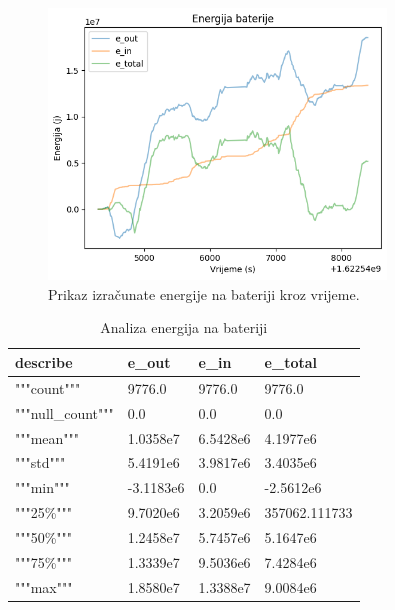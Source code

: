 \begin{figure}
    \centering
    \includegraphics[width=0.8\textwidth]{images/energies_battery.png}
    \caption{Prikaz izračunate energije na bateriji kroz vrijeme.}
    \label{fig:h:energy_graph}
\end{figure}


\begin{table}[!ht]
    \centering
    \caption{Analiza energija na bateriji}
    \begin{tabular}{llll}
    \hline
        \textbf{describe} & \textbf{e\_out} & \textbf{e\_in} & \textbf{e\_total} \\ \hline
        """count""" & 9776.0 & 9776.0 & 9776.0 \\ 
        """null\_count""" & 0.0 & 0.0 & 0.0 \\ 
        """mean""" & 1.0358e7 & 6.5428e6 & 4.1977e6 \\ 
        """std""" & 5.4191e6 & 3.9817e6 & 3.4035e6 \\ 
        """min""" & -3.1183e6 & 0.0 & -2.5612e6 \\ 
        """25\%""" & 9.7020e6 & 3.2059e6 & 357062.111733 \\ 
        """50\%""" & 1.2458e7 & 5.7457e6 & 5.1647e6 \\ 
        """75\%""" & 1.3339e7 & 9.5036e6 & 7.4284e6 \\ 
        """max""" & 1.8580e7 & 1.3388e7 & 9.0084e6 \\ \hline
    \end{tabular}
    \label{table:c:energies_battery}
\end{table}
